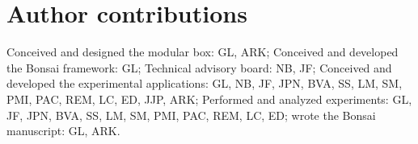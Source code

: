 
\section{Author contributions}

Conceived and designed the modular box: GL, ARK; Conceived and developed the Bonsai framework: GL; Technical advisory board: NB, JF; Conceived and developed the experimental applications: GL, NB, JF, JPN, BVA, SS, LM, SM, PMI, PAC, REM, LC, ED, JJP, ARK; Performed and analyzed experiments: GL, JF, JPN, BVA, SS, LM, SM, PMI, PAC, REM, LC, ED; wrote the Bonsai manuscript: GL, ARK.
